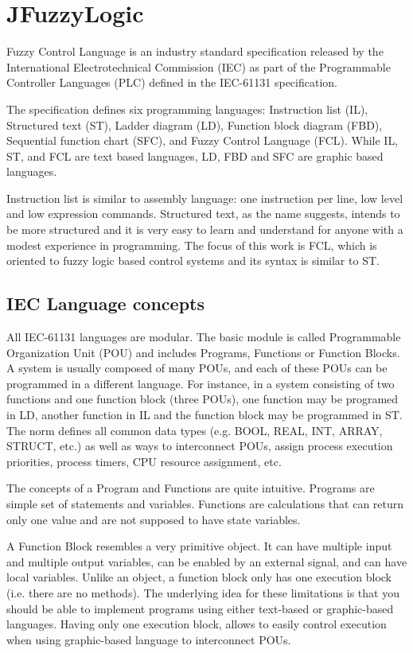 \documentclass[conference]{IEEEtran}
\begin{document}
\section{JFuzzyLogic \label{sec:jFu}}

Fuzzy Control Language is an industry standard specification released by the International Electrotechnical Commission (IEC) as part of the Programmable Controller Languages (PLC) defined in the IEC-61131 specification.

The specification defines six programming languages: Instruction list (IL), Structured text (ST), Ladder diagram (LD), Function block diagram (FBD), Sequential function chart (SFC), and Fuzzy Control Language (FCL). 
While IL, ST, and FCL are text based languages, LD, FBD and SFC are graphic based languages.

Instruction list is similar to assembly language: one instruction per line, low level and low expression commands. Structured text, as the name suggests, intends to be more structured and it is very easy to learn and understand for anyone with a modest experience in programming. 
The focus of this work is FCL, which is oriented to fuzzy logic based control systems and its syntax is similar to ST.

\subsection{IEC Language concepts \label{sec:IecConcepts}}

All IEC-61131 languages are modular.
The basic module is called Programmable Organization Unit (POU) and includes Programs, Functions or Function Blocks. 
A system is usually composed of many POUs, and each of these POUs can be programmed in a different language. 
For instance, in a system consisting of two functions and one function block (three POUs), one function may be programed in LD, another function in IL and the function block may be programmed in ST. 
The norm defines all common data types (e.g. BOOL, REAL, INT, ARRAY, STRUCT, etc.) as well as ways to interconnect POUs, assign process execution priorities, process timers, CPU resource assignment, etc.

The concepts of a Program and Functions are quite intuitive.
Programs are simple set of statements and variables.
Functions are calculations that can return only one value and are not supposed to have state variables.

A Function Block resembles a very primitive object. 
It can have multiple input and multiple output variables, can be enabled by an external signal, and can have local variables. 
Unlike an object, a function block only has one execution block (i.e. there are no methods). 
The underlying idea for these limitations is that you should be able to implement programs using either text-based or graphic-based languages. 
Having only one execution block, allows to easily control execution when using graphic-based language to interconnect POUs.
\end{document}
